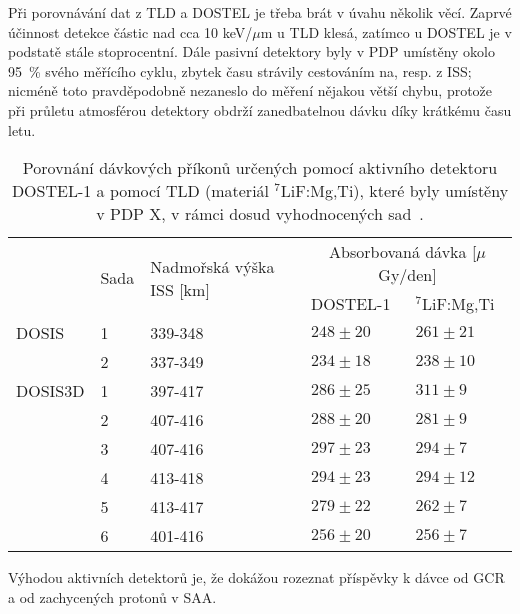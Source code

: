 Při porovnávání dat z TLD a DOSTEL je třeba brát v úvahu několik věcí. Zaprvé účinnost detekce částic nad cca 10 keV/$\mu$m u TLD klesá, zatímco u DOSTEL je v podstatě stále stoprocentní. Dále pasivní detektory byly v PDP umístěny okolo 95~\% svého měřícího cyklu, zbytek času strávily cestováním na, resp. z ISS; nicméně toto pravděpodobně nezaneslo do měření nějakou větší chybu, protože při průletu atmosférou detektory obdrží zanedbatelnou dávku díky krátkému času letu.
\begin{table}[H]
  \centering
  \def\arraystretch{1}
  \footnotesize
  \caption{Porovnání dávkových příkonů určených pomocí aktivního detektoru DOSTEL-1 a pomocí TLD (materiál $^7$LiF:Mg,Ti), které byly umístěny v PDP X, v rámci dosud vyhodnocených sad~\cite{dosis}.}
  \label{tab:dosis_vysl_srovnaniPassiveActive}
  \begin{tabular}{lll|ll}
	\toprule
	&\multirow{2}{*}{Sada}&\multirow{2}{*}{Nadmořská výška ISS [km]}&\multicolumn{2}{c}{Absorbovaná dávka [$\mu$Gy/den]}\\
	 & & &DOSTEL-1&$^7$LiF:Mg,Ti\\
	\midrule
	DOSIS	&1&339-348&$248\pm20$&$261\pm21$\\ 
			&2&337-349&$234\pm18$&$238\pm10$\\
	DOSIS3D	&1&397-417&$286\pm25$&$311\pm9 $\\
			&2&407-416&$288\pm20$&$281\pm9 $\\
			&3&407-416&$297\pm23$&$294\pm7 $\\
			&4&413-418&$294\pm23$&$294\pm12$\\
			&5&413-417&$279\pm22$&$262\pm7 $\\
			&6&401-416&$256\pm20$&$256\pm7 $\\
	\bottomrule
  \end{tabular}
\end{table}

Výhodou aktivních detektorů je, že dokážou rozeznat příspěvky k dávce od GCR a od zachycených protonů v SAA.
